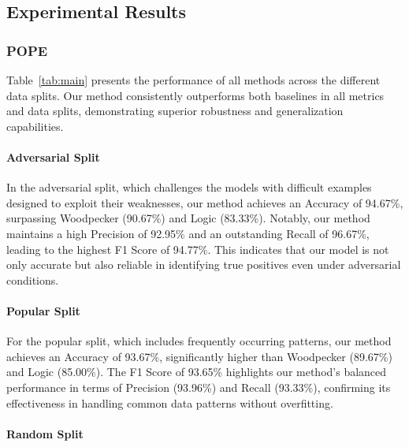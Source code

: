 \subsection{Experimental Results}


\subsubsection{POPE}

Table~\ref{tab:main} presents the performance of all methods across the different data splits. Our method consistently outperforms both baselines in all metrics and data splits, demonstrating superior robustness and generalization capabilities.

\vspace{-4pt}
\paragraph{Adversarial Split}

In the adversarial split, which challenges the models with difficult examples designed to exploit their weaknesses, our method achieves an Accuracy of 94.67\%, surpassing Woodpecker (90.67\%) and Logic (83.33\%). Notably, our method maintains a high Precision of 92.95\% and an outstanding Recall of 96.67\%, leading to the highest F1 Score of 94.77\%. This indicates that our model is not only accurate but also reliable in identifying true positives even under adversarial conditions.

\vspace{-4pt}
\paragraph{Popular Split}

For the popular split, which includes frequently occurring patterns, our method achieves an Accuracy of 93.67\%, significantly higher than Woodpecker (89.67\%) and Logic (85.00\%). The F1 Score of 93.65\% highlights our method's balanced performance in terms of Precision (93.96\%) and Recall (93.33\%), confirming its effectiveness in handling common data patterns without overfitting.

\vspace{-4pt}
\paragraph{Random Split}

